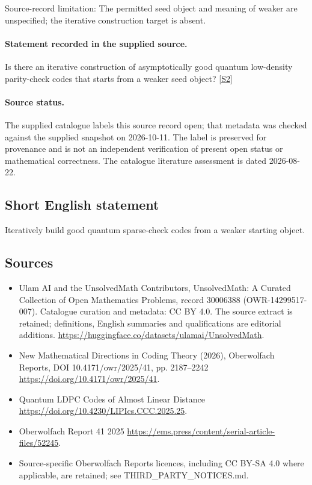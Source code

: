 \documentclass[11pt]{article}
\begin{document}
Source-record limitation: The permitted seed object and meaning of weaker are unspecified; the iterative construction target is absent.
\paragraph{Statement recorded in the supplied source.}
Is there an iterative construction of asymptotically good quantum low-density parity-check codes that starts from a weaker seed object? \href{https://doi.org/10.4171/owr/2025/41}{[S2]}
\paragraph{Source status.}
The supplied catalogue labels this source record open; that metadata was checked against the supplied snapshot on 2026-10-11. The label is preserved for provenance and is not an independent verification of present open status or mathematical correctness. The catalogue literature assessment is dated 2026-08-22.
\subsection{Short English statement}
Iteratively build good quantum sparse-check codes from a weaker starting object.
\subsection{Sources}
\begin{itemize}
\item[S1] Ulam AI and the UnsolvedMath Contributors, UnsolvedMath: A Curated Collection of Open Mathematics Problems, record 30006388 (OWR-14299517-007). Catalogue curation and metadata: CC BY 4.0. The source extract is retained; definitions, English summaries and qualifications are editorial additions.
\url{https://huggingface.co/datasets/ulamai/UnsolvedMath}.
\item[S2] New Mathematical Directions in Coding Theory (2026), Oberwolfach Reports, DOI 10.4171/owr/2025/41, pp. 2187--2242
\url{https://doi.org/10.4171/owr/2025/41}.
\item[S3] Quantum LDPC Codes of Almost Linear Distance
\url{https://doi.org/10.4230/LIPIcs.CCC.2025.25}.
\item[S4] Oberwolfach Report 41 2025
\url{https://ems.press/content/serial-article-files/52245}.
\item Source-specific Oberwolfach Reports licences, including CC BY-SA 4.0 where applicable, are retained; see THIRD\_PARTY\_NOTICES.md.
\end{itemize}
\end{document}
